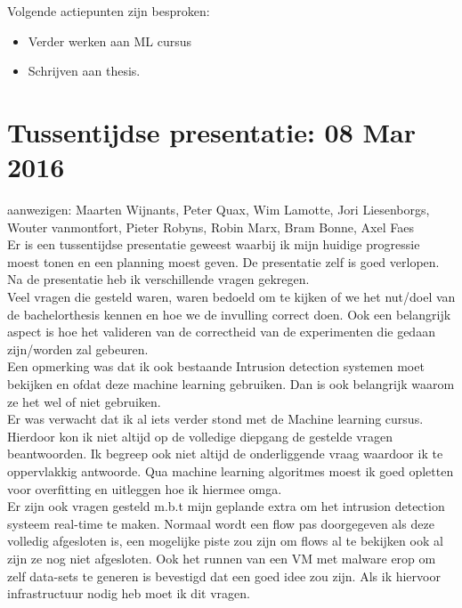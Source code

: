 \noindent Volgende actiepunten zijn besproken:
\begin{itemize}  		
\item Verder werken aan ML cursus
        \item Schrijven aan thesis.
\end{itemize}

\section{Tussentijdse presentatie: 08 Mar 2016}
aanwezigen: Maarten Wijnants, Peter Quax, Wim Lamotte, Jori Liesenborgs, Wouter vanmontfort, Pieter Robyns, Robin Marx, Bram Bonne, Axel Faes\\

\noindent Er is een tussentijdse presentatie geweest waarbij ik mijn huidige progressie moest tonen en een planning moest geven. De presentatie zelf is goed verlopen. Na de presentatie heb ik verschillende vragen gekregen. \\

\noindent Veel vragen die gesteld waren, waren bedoeld om te kijken of we het nut/doel van de bachelorthesis kennen en hoe we de invulling correct doen. Ook een belangrijk aspect is hoe het valideren van de correctheid van de experimenten die gedaan zijn/worden zal gebeuren. \\

\noindent Een opmerking was dat ik ook bestaande Intrusion detection systemen moet bekijken en ofdat deze machine learning gebruiken. Dan is ook belangrijk waarom ze het wel of niet gebruiken. \\

\noindent Er was verwacht dat ik al iets verder stond met de Machine learning cursus. Hierdoor kon ik niet altijd op de volledige diepgang de gestelde vragen beantwoorden. Ik begreep ook niet altijd de onderliggende vraag waardoor ik te oppervlakkig antwoorde. Qua machine learning algoritmes moest ik goed opletten voor overfitting en uitleggen hoe ik hiermee omga.\\

\noindent Er zijn ook vragen gesteld m.b.t mijn geplande extra om het intrusion detection systeem real-time te maken. Normaal wordt een flow pas doorgegeven als deze volledig afgesloten is, een mogelijke piste zou zijn om flows al te bekijken ook al zijn ze nog niet afgesloten. Ook het runnen van een VM met malware erop om zelf data-sets te generen is bevestigd dat een goed idee zou zijn. Als ik hiervoor infrastructuur nodig heb moet ik dit vragen.\\

